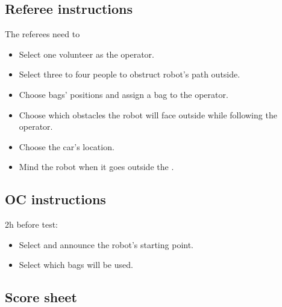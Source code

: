 \subsection*{Referee instructions}

The referees need to
\begin{itemize}[nosep]
	\item Select one volunteer as the operator.
	\item Select three to four people to obstruct robot's path outside.
	\item Choose bags' positions and assign a bag to the operator.
	\item Choose which obstacles the robot will face outside while following the operator.
	\item Choose the car's location.
	\item Mind the robot when it goes outside the \Arena{}.
\end{itemize}

\subsection*{OC instructions}

2h before test:
\begin{itemize}[nosep]
	\item Select and announce the robot's starting point.
	\item Select which bags will be used.
\end{itemize}

\subsection*{Score sheet}

